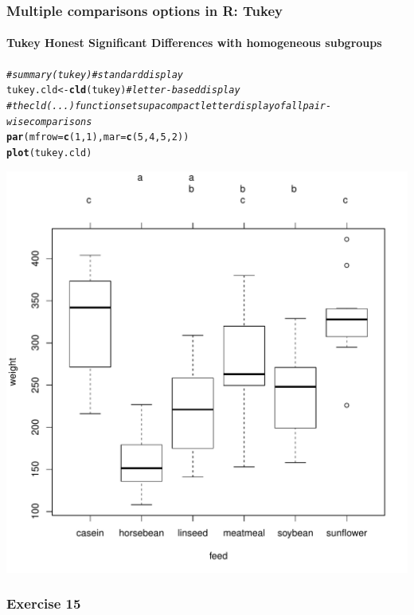 \documentclass{beamer}\usepackage[]{graphicx}\usepackage[]{color}
\makeatletter
\newcommand{\hlnum}[1]{\textcolor[rgb]{0.686,0.059,0.569}{#1}}%
\newcommand{\hlcom}[1]{\textcolor[rgb]{0.678,0.584,0.686}{\textit{#1}}}%
\newcommand{\hlstd}[1]{\textcolor[rgb]{0.345,0.345,0.345}{#1}}%
\newcommand{\hlkwb}[1]{\textcolor[rgb]{0.69,0.353,0.396}{#1}}%
\newcommand{\hlkwc}[1]{\textcolor[rgb]{0.333,0.667,0.333}{#1}}%
\newcommand{\hlkwd}[1]{\textcolor[rgb]{0.737,0.353,0.396}{\textbf{#1}}}%
\newenvironment{kframe}{%
 \def\at@end@of@kframe{}%
 \ifinner\ifhmode%
  \def\at@end@of@kframe{\end{minipage}}%
  \begin{minipage}{\columnwidth}%
 \fi\fi%
 \def\FrameCommand##1{\hskip\@totalleftmargin \hskip-\fboxsep
 \colorbox{shadecolor}{##1}\hskip-\fboxsep
     \hskip-\linewidth \hskip-\@totalleftmargin \hskip\columnwidth}%
 \MakeFramed {\advance\hsize-\width
   \@totalleftmargin\z@ \linewidth\hsize
   \@setminipage}}%
 {\par\unskip\endMakeFramed%
 \at@end@of@kframe}
\newenvironment{knitrout}{}{} %
\makeatother
\begin{document}
{{{
\begin{frame}[fragile]
\frametitle{Multiple comparisons options in R: Tukey}
\framesubtitle{Tukey Honest Significant Differences with homogeneous subgroups}
\begin{knitrout}\tiny
{}\color{fgcolor}\begin{kframe}
\begin{alltt}
\hlcom{# summary(tukey)          # standard display}
\hlstd{tukey.cld} \hlkwb{<-} \hlkwd{cld}\hlstd{(tukey)}   \hlcom{# letter-based display}
\hlcom{# the cld(...) function sets up a compact letter display of all pair-wise comparisons}
\hlkwd{par}\hlstd{(}\hlkwc{mfrow}\hlstd{=}\hlkwd{c}\hlstd{(}\hlnum{1}\hlstd{,}\hlnum{1}\hlstd{),} \hlkwc{mar}\hlstd{=}\hlkwd{c}\hlstd{(}\hlnum{5}\hlstd{,} \hlnum{4}\hlstd{,} \hlnum{5}\hlstd{,} \hlnum{2}\hlstd{))}
\hlkwd{plot}\hlstd{(tukey.cld)}
\end{alltt}
\end{kframe}

{\centering \includegraphics[width=0.6\linewidth]{figure/unnamed-chunk-55-1} 

}



\end{knitrout}
\end{frame}


\begin{frame}[fragile]
\frametitle{Exercise 15}
\end{frame}

}}}
\end{document}
